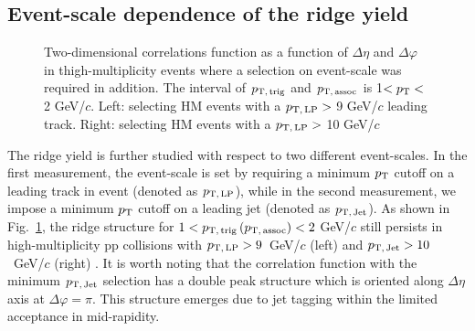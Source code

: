 \subsection{Event-scale dependence of the ridge yield}
\begin{figure}[h!]
	\centering
	\caption{ Two-dimensional correlations function as a function of $\Delta\eta$ and $\Delta\varphi$ in thigh-multiplicity events where a selection on event-scale was required in addition. The interval of $p_\mathrm{T,\,trig}$ and $p_\mathrm{T,\,assoc}$ is 1$<p_\mathrm{T}<$2 GeV/$c$. Left: selecting HM events with a $p_\mathrm{T,\,LP}>$ 9 GeV/$c$ leading track. Right: selecting HM events with a $p_\mathrm{T,\,LP}>$ 10 GeV/$c$}
	\label{fig:PlotCorrHMTSel}
\end{figure}

The ridge yield is further studied with respect to two different event-scales. In the first measurement, the event-scale is set by requiring a minimum $p_\mathrm{T}$ cutoff on a leading track in event (denoted as $p_\mathrm{T,\,LP}$), while in the second measurement, we impose a minimum $p_\mathrm{T}$ cutoff on a leading jet  (denoted as $p_\mathrm{T,\,Jet}$). As shown in Fig.~\ref{fig:PlotCorrHMTSel}, the ridge structure for $1< p_\mathrm{T,\,trig}\,(p_\mathrm{T,\,assoc}) <2$ GeV/$c$ still persists in high-multiplicity pp collisions with $p_\mathrm{T,\,LP}>9$~GeV/$c$ (left) and $p_\mathrm{T,\,Jet}>10$~GeV/$c$ (right) .  %
It is worth noting that the correlation function with the minimum $p_\mathrm{T,\,Jet}$ selection has a double peak structure which is oriented along $\Delta\eta$ axis at $\Delta\varphi=\pi$. This structure emerges due to jet tagging within the limited acceptance in mid-rapidity.

